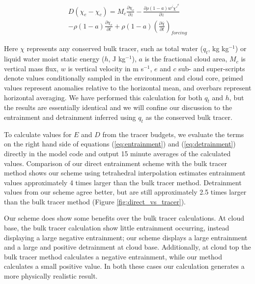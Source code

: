 \documentclass[12pt]{article}
\begin{document}
\begin{equation}
  \label{eq:detrainment}
  \begin{split}
    D (\chi_e - \chi_c)
    = M_c \frac{\partial \chi_e}{\partial z}
    - \frac{\partial \rho (1 - a) \overline{w' \chi'}^e}{\partial z} \\
    - \rho (1 - a) \frac{\partial \chi_e}{\partial t}
    + \rho (1 - a) \left(\frac{\partial \bar{\chi}}{\partial t}\right)_{forcing}
  \end{split}
\end{equation}

Here $\chi$ represents any conserved bulk tracer, such as total water ($q_t$, 
kg kg$^{-1}$) or liquid water moist static energy ($h$, J kg$^{-1}$), $a$ is 
the fractional cloud area, $M_c$ is vertical mass flux, $w$ is vertical 
velocity in m s$^{-1}$, $e$ and $c$ sub- and super-scripts denote values 
conditionally sampled in the environment and cloud core, primed values represent 
anomalies relative to the horizontal mean, and overbars represent horizontal 
averaging.  We have performed this calculation for both $q_t$ and $h$, but the 
results are essentially identical and we will confine our discussion to the 
entrainment and detrainment inferred using $q_t$ as the conserved bulk tracer.  

To calculate values for $E$ and $D$ from the tracer budgets, we evaluate the 
terms on the right hand side of equations (\ref{eq:entrainment}) and 
(\ref{eq:detrainment}) directly in the model code and output 15 minute averages 
of the calculated values.  Comparison of our direct entrainment scheme with the 
bulk tracer method shows our scheme using tetrahedral interpolation estimates
entrainment values approximately 4 times larger than the bulk tracer method.
Detrainment values from our scheme agree better, but are still approximately 
2.5 times larger than the bulk tracer method (Figure 
\ref{fig:direct_vs_tracer}).

Our scheme does show some benefits over the bulk tracer calculations.  At 
cloud base, the bulk tracer calculation show little entrainment occurring, 
instead displaying a large negative entrainment; our scheme displays a large 
entrainment and a large and positive detrainment at cloud base.  Additionally, 
at cloud top the bulk tracer method calculates a negative entrainment, 
while our method calculates a small positive value.  In both these cases our 
calculation generates a more physically realistic result.
\end{document}

